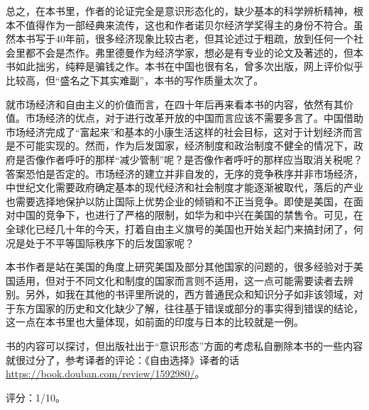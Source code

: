 总之，在本书里，作者的论证完全是意识形态化的，缺少基本的科学辨析精神，根本不值得作为一部经典来流传，这也和作者诺贝尔经济学奖得主的身份不符合。虽然本书写于40年前，很多经济现象比较古老，但其论述过于粗疏，放到任何一个社会里都不会是杰作。弗里德曼作为经济学家，想必是有专业的论文及著述的，但本书如此拙劣，纯粹是骗钱之作。本书在中国也很有名，曾多次出版，网上评价似乎比较高，但“盛名之下其实难副”，本书的写作质量太次了。

就市场经济和自由主义的价值而言，在四十年后再来看本书的内容，依然有其价值。市场经济的优点，对于进行改革开放的中国而言应该不需要多言了。中国借助市场经济完成了“富起来”和基本的小康生活这样的社会目标，这对于计划经济而言是不可能实现的。然而，作为后发国家，经济制度和政治制度不健全的情况下，政府是否像作者呼吁的那样“减少管制”呢？是否像作者呼吁的那样应当取消关税呢？答案恐怕是否定的。市场经济的建立并非自发的，无序的竞争秩序并非市场经济，中世纪文化需要政府确定基本的现代经济和社会制度才能逐渐被取代，落后的产业也需要选择地保护以防止国际上优势企业的倾销和不正当竞争。即使是美国，在面对中国的竞争下，也进行了严格的限制，如华为和中兴在美国的禁售令。可见，在全球化已经几十年的今天，打着自由主义旗号的美国也开始关起门来搞封闭了，何况是处于不平等国际秩序下的后发国家呢？

本书作者是站在美国的角度上研究美国及部分其他国家的问题的，很多经验对于美国适用，但对于不同文化和制度的国家而言则不适用，这一点可能需要读者去辨别。另外，如我在其他的书评里所说的，西方普通民众和知识分子如非该领域，对于东方国家的历史和文化缺少了解，往往基于错误或部分的事实得到错误的结论，这一点在本书里也大量体现，如前面的印度与日本的比较就是一例。

书的内容可以探讨，但出版社出于“意识形态”方面的考虑私自删除本书的一些内容就很过分了，参考译者的评论：《自由选择》译者的话 \url{https://book.douban.com/review/1592980/}。

评分：1/10。